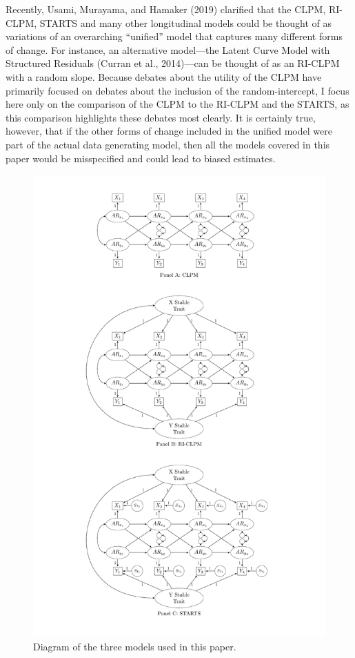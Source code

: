 \documentclass[
  english,
  man,floatsintext]{apa6}
\begin{document}
Recently, Usami, Murayama, and Hamaker (2019) clarified that the CLPM, RI-CLPM, STARTS and many other longitudinal models could be thought of as variations of an overarching ``unified'' model that captures many different forms of change. For instance, an alternative model---the Latent Curve Model with Structured Residuals (Curran et al., 2014)---can be thought of as an RI-CLPM with a random slope. Because debates about the utility of the CLPM have primarily focused on debates about the inclusion of the random-intercept, I focus here only on the comparison of the CLPM to the RI-CLPM and the STARTS, as this comparison highlights these debates most clearly. It is certainly true, however, that if the other forms of change included in the unified model were part of the actual data generating model, then all the models covered in this paper would be misspecified and could lead to biased estimates.

\begin{figure}
\includegraphics[height=0.9\textheight]{images/comboFigure} \caption{Diagram of the three models used in this paper.}\label{fig:riclpmFig}
\end{figure}
\end{document}
